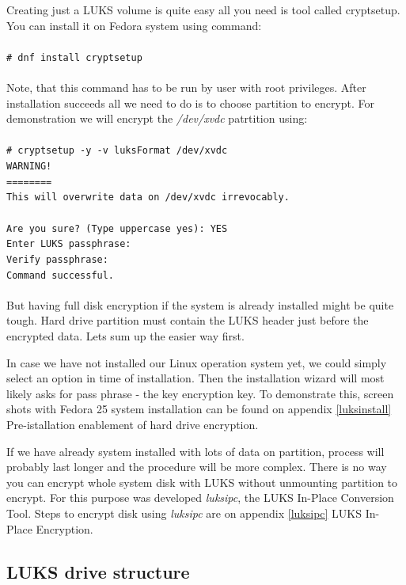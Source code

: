 Creating just a LUKS volume is quite easy all you need is tool called cryptsetup.
You can install it on Fedora system using command:
\\\\
\texttt{\# dnf install cryptsetup}
\\\\
Note, that this command has to be run by user with root privileges.
After installation succeeds all we need to do is to choose partition to encrypt.
For demonstration we will encrypt the {\it /dev/xvdc} patrtition using:
\\\\
\texttt{\# cryptsetup -y -v luksFormat /dev/xvdc\\
WARNING!\\
========\\
This will overwrite data on /dev/xvdc irrevocably.\\
\\
Are you sure? (Type uppercase yes): YES\\
Enter LUKS passphrase:\\
Verify passphrase:\\
Command successful.\\
}
\\
But having full disk encryption if the system is already installed might be quite tough.
Hard drive partition must contain the LUKS header just before the encrypted data.
Lets sum up the easier way first.

In case we have not installed our Linux operation system yet, we could simply select an option in time of installation.
Then the installation wizard will most likely asks for pass phrase - the key encryption key.
To demonstrate this, screen shots with Fedora 25 system installation can be found on appendix \ref{luksinstall} Pre-istallation enablement of hard drive encryption.

If we have already system installed with lots of data on partition, process will probably last longer and the procedure will be more complex.
There is no way you can encrypt whole system disk with LUKS without unmounting partition to encrypt.
For this purpose was developed {\it luksipc}, the LUKS In-Place Conversion Tool.
Steps to encrypt disk using {\it luksipc} are on appendix \ref{luksipc} LUKS In-Place Encryption.

\subsection{LUKS drive structure}

